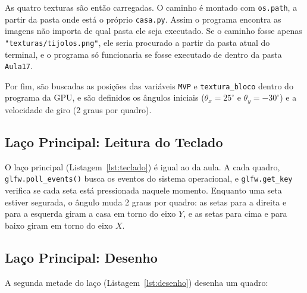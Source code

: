 \documentclass{article}
\begin{document}
As quatro texturas são então carregadas. O caminho é montado com \texttt{os.path}, a partir da pasta onde está o próprio \texttt{casa.py}. Assim o programa encontra as imagens não importa de qual pasta ele seja executado. Se o caminho fosse apenas \texttt{"texturas/tijolos.png"}, ele seria procurado a partir da pasta atual do terminal, e o programa só funcionaria se fosse executado de dentro da pasta \texttt{Aula17}.

Por fim, são buscadas as posições das variáveis \texttt{MVP} e \texttt{textura\_bloco} dentro do programa da GPU, e são definidos os ângulos iniciais ($\theta_x = 25^\circ$ e $\theta_y = -30^\circ$) e a velocidade de giro (2 graus por quadro).



\subsection{Laço Principal: Leitura do Teclado}

O laço principal (Listagem~\ref{lst:teclado}) é igual ao da aula. A cada quadro, \texttt{glfw.poll\_events()} busca os eventos do sistema operacional, e \texttt{glfw.get\_key} verifica se cada seta está pressionada naquele momento. Enquanto uma seta estiver segurada, o ângulo muda 2 graus por quadro: as setas para a direita e para a esquerda giram a casa em torno do eixo $Y$, e as setas para cima e para baixo giram em torno do eixo $X$.



\subsection{Laço Principal: Desenho}

A segunda metade do laço (Listagem~\ref{lst:desenho}) desenha um quadro:
\end{document}
